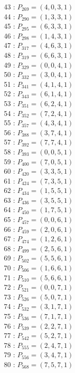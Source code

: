\documentclass{article}
\begin{document}
{\begin{multicols}{3}
43 : $P_{269}=( 4, 0, 3, 1 )$\\
44 : $P_{290}=( 1, 3, 3, 1 )$\\
45 : $P_{295}=( 6, 3, 3, 1 )$\\
46 : $P_{298}=( 1, 4, 3, 1 )$\\
47 : $P_{317}=( 4, 6, 3, 1 )$\\
48 : $P_{319}=( 6, 6, 3, 1 )$\\
49 : $P_{329}=( 0, 0, 4, 1 )$\\
50 : $P_{332}=( 3, 0, 4, 1 )$\\
51 : $P_{341}=( 4, 1, 4, 1 )$\\
52 : $P_{343}=( 6, 1, 4, 1 )$\\
53 : $P_{351}=( 6, 2, 4, 1 )$\\
54 : $P_{352}=( 7, 2, 4, 1 )$\\
55 : $P_{357}=( 4, 3, 4, 1 )$\\
56 : $P_{388}=( 3, 7, 4, 1 )$\\
57 : $P_{392}=( 7, 7, 4, 1 )$\\
58 : $P_{393}=( 0, 0, 5, 1 )$\\
59 : $P_{400}=( 7, 0, 5, 1 )$\\
60 : $P_{420}=( 3, 3, 5, 1 )$\\
61 : $P_{424}=( 7, 3, 5, 1 )$\\
62 : $P_{434}=( 1, 5, 5, 1 )$\\
63 : $P_{436}=( 3, 5, 5, 1 )$\\
64 : $P_{450}=( 1, 7, 5, 1 )$\\
65 : $P_{457}=( 0, 0, 6, 1 )$\\
66 : $P_{459}=( 2, 0, 6, 1 )$\\
67 : $P_{474}=( 1, 2, 6, 1 )$\\
68 : $P_{499}=( 2, 5, 6, 1 )$\\
69 : $P_{502}=( 5, 5, 6, 1 )$\\
70 : $P_{506}=( 1, 6, 6, 1 )$\\
71 : $P_{510}=( 5, 6, 6, 1 )$\\
72 : $P_{521}=( 0, 0, 7, 1 )$\\
73 : $P_{526}=( 5, 0, 7, 1 )$\\
74 : $P_{532}=( 3, 1, 7, 1 )$\\
75 : $P_{536}=( 7, 1, 7, 1 )$\\
76 : $P_{539}=( 2, 2, 7, 1 )$\\
77 : $P_{542}=( 5, 2, 7, 1 )$\\
78 : $P_{555}=( 2, 4, 7, 1 )$\\
79 : $P_{556}=( 3, 4, 7, 1 )$\\
80 : $P_{568}=( 7, 5, 7, 1 )$\\
\end{multicols}


}
\end{document}
